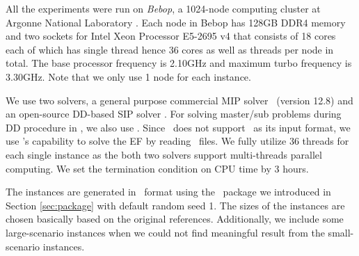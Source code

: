 All the experiments were run on \textit{Bebop}, a 1024-node computing cluster at Argonne National Laboratory \cite{bebop}. Each node in Bebop has 128GB DDR4 memory and two sockets for Intel Xeon Processor E5-2695 v4 that consists of 18 cores each of which has single thread hence 36 cores as well as threads per node in total. The base processor frequency is 2.10GHz and maximum turbo frequency is 3.30GHz. Note that we only use 1 node for each instance.

We use two solvers, a general purpose commercial MIP solver \cplex\ (version 12.8) and an open-source DD-based SIP solver \dsp. For solving master/sub problems during DD procedure in \dsp, we also use \cplex. Since \cplex\ does not support \smps\ as its input format, we use \dsp's capability to solve the EF by reading \smps\ files. We fully utilize 36 threads for each single instance as the both two solvers support multi-threads parallel computing. We set the termination condition on CPU time by 3 hours. 

The instances are generated in \smps\ format using the \julia\ package we introduced in Section \ref{sec:package} with default random seed 1. The sizes of the instances are chosen basically based on the original references. Additionally, we include some large-scenario instances when we could not find meaningful result from the small-scenario instances.


